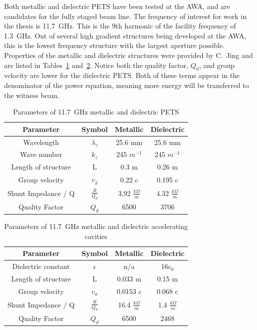 Both metallic and dielectric PETS have been tested at the AWA, 
and are candidates for the fully staged beam line. 
The frequency of interest for work in the thesis is \SI{11.7}{GHz}. 
This is the 9th harmonic of the facility frequency of \SI{1.3}{GHz}.
Out of several high gradient structures being developed at the AWA, 
this is the lowest frequency structure with the largest aperture possible. 
Properties of the metallic and dielectric structures were provided by C.~Jing and are listed in 
Tables~\ref{table:PETS} and~\ref{table:acc}. 
Notice both the quality factor, $Q_d$, and group velocity are lower for the dielectric PETS. 
Both of these terms appear in the denominator of the power equation, meaning more
energy will be transferred to the witness beam.
\begin{table}
	\begin{center}
	\caption{Parameters of \SI{11.7}{GHz} metallic and dielectric PETS}
	\label{table:PETS}
	
			\begin{tabular}{cccc}  
			\toprule
			\toprule
			\textbf{Parameter} & \textbf{Symbol} & \textbf{Metallic }& \textbf{Dielectric} \\
			\midrule
			Wavelength 	& $\lambda_{z}$ & 25.6 mm 	&  25.6 mm	\\  
			Wave number & $k_{z}$ 		& 245 $m^{-1}$ 	& 245 $m^{-1}$\\  
			Length of structure & L & 0.3 m & 0.26 m\\  
			Group velocity & $v_{g}$ & 0.22 c & 0.195 c\\  
			Shunt Impedance / Q & $\frac{R}{Q_{d}}$ & 3.92 $\frac{k\Omega}{m}$  & 4.32 $\frac{k\Omega}{m}$\\  
			Quality Factor & $Q_{d}$ & 6500 &3706\\  
			\bottomrule		
		\end{tabular}
\end{center}
\end{table}
\begin{table}
	\begin{center}
		\caption{Parameters of \SI{11.7}{GHz} metallic and dielectric accelerating cavities}
		\label{table:acc}
		
		\begin{tabular}{cccc}  
			\toprule
			\toprule
			\textbf{Parameter} & \textbf{Symbol} & \textbf{Metallic }& \textbf{Dielectric} \\
			\midrule
			Dielectric constant & $\epsilon$ & n/a & 16\;$\epsilon_0$ \\
			Length of structure & L & 0.033 m & 0.15 m\\  
			Group velocity & $v_{a}$ & 0.0153 c & 0.068 c\\  
			Shunt Impedance / Q & $\frac{R}{Q_{d}}$ & 16.4 $\frac{k\Omega}{m}$  & 1.4 $\frac{k\Omega}{m}$\\  
			Quality Factor & $Q_{d}$ & 6500  &2468\\  
			\bottomrule		
		\end{tabular}
	\end{center}
\end{table}

